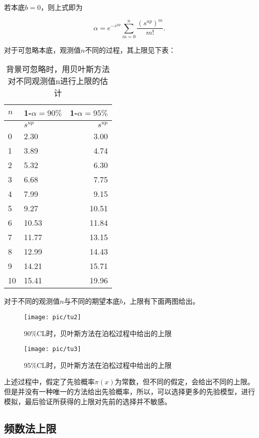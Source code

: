 若本底$b=0$，则上式即为

\begin{equation}\label{key}
\alpha=e^{-s^{up}}\sum_{m=0}^{n} \frac{(s^{up})^{m}}{m!}.
\end{equation}

对于可忽略本底，观测值$n$不同的过程，其上限见下表：

\begin{table}[hbt]
	\caption{背景可忽略时，用贝叶斯方法对不同观测值n进行上限的估计}
	\centering
	\begin{tabular}{llr}
		\toprule
		$n$ & 1-$\alpha=90\%$ & 1-$\alpha=95\%$ \\
		\cmidrule
		  & $s^{up}$ & $s^{up}$ \\
		\midrule
		0 & 2.30 & 3.00 \\
		1 & 3.89 & 4.74 \\
		2 & 5.32 & 6.30 \\
		3 & 6.68 & 7.75 \\
		4 & 7.99 & 9.15 \\
		5 & 9.27 & 10.51 \\
		6 & 10.53 & 11.84 \\
		7 & 11.77 & 13.15 \\
		8 & 12.99 & 14.43 \\
		9 & 14.21 & 15.71 \\
		10 & 15.41 & 19.96 \\
		\bottomrule
	\end{tabular}
	\label{tab:1}
\end{table}

对于不同的观测值$n$与不同的期望本底$b$，上限有下面两图给出。

\begin{figure}[ht]
	\centering
	\texttt{[image: pic/tu2]}
	\caption{90$\%$CL时，贝叶斯方法在泊松过程中给出的上限}
	\label{fig:2}
\end{figure}

\begin{figure}[ht]
	\centering
	\texttt{[image: pic/tu3]}
	\caption{95$\%$CL时，贝叶斯方法在泊松过程中给出的上限}
	\label{fig:3}
\end{figure}

上述过程中，假定了先验概率$\pi(x)$为常数，但不同的假定，会给出不同的上限。但是并没有一种唯一的方法给出先验概率，所以，可以选择更多的先验模型，进行模拟，最后验证所获得的上限对先前的选择并不敏感。

\subsection{频数法上限}

